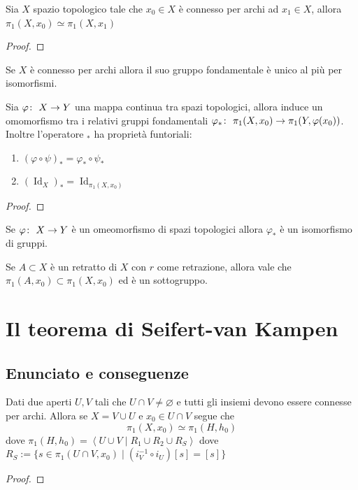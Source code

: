 \begin{theorem}
	Sia $X$ spazio topologico tale che $x_0 \in X$ è connesso per archi ad $x_1 \in X$, allora $\pi_1(X, x_0) \simeq \pi_1(X, x_1)$
\end{theorem}
\begin{proof}
	
\end{proof}

\begin{corollary}
	Se $X$ è connesso per archi allora il suo gruppo fondamentale è unico al più per isomorfismi.
\end{corollary}
	
	
\begin{theorem}
	Sia $\varphi \colon\ X \rightarrow Y$ una mappa continua tra spazi topologici, allora induce un omomorfismo tra i relativi gruppi fondamentali $\varphi_* \colon\ \pi_1(X, x_0) \rightarrow \pi_1(Y, \varphi(x_0))$. Inoltre l'operatore $_*$ ha proprietà funtoriali:
	\begin{enumerate}
		\item $(\varphi \circ \psi)_* = \varphi_* \circ \psi_*$
		\item $(\operatorname{Id}_{X})_* = \operatorname{Id}_{\pi_1(X, x_0)}$ 
	\end{enumerate}
\end{theorem}
\begin{proof}
\end{proof}

\begin{corollary}
	Se $\varphi \colon\ X \rightarrow Y$ è un omeomorfismo di spazi topologici allora $\varphi_*$ è un isomorfismo di gruppi. 
\end{corollary}

\begin{theorem}
	Se $A \subset X$ è un retratto di $X$ con $r$ come retrazione, allora vale che $\pi_1(A, x_0) \subset \pi_1(X, x_0)$ ed è un sottogruppo.  
\end{theorem}
	
\section{Il teorema di Seifert-van Kampen}
\subsection{\textcolor{TopAlg}{\textbf{Enunciato e conseguenze}}}


\begin{theorem}
	Dati due aperti $U, V$ tali che $U \cap V \neq \varnothing$ e tutti gli insiemi devono essere connesse per archi. Allora se $X = V \cup U$ e $x_0 \in U\cap V$ segue che 
	\begin{equation*}
		\pi_1(X, x_0) \simeq \pi_1(H, h_0)
	\end{equation*} 
	dove $\pi_1(H,h_0) = \left\langle U \cup V \mid R_1 \cup R_2 \cup R_S \right\rangle$ dove $R_S := \{s \in \pi_1(U \cap V,x_0) \mid (i^{-1}_V \circ i_{U}) \left[s\right] = \left[s\right]\}$ 
\end{theorem}
\begin{proof}
\end{proof}

